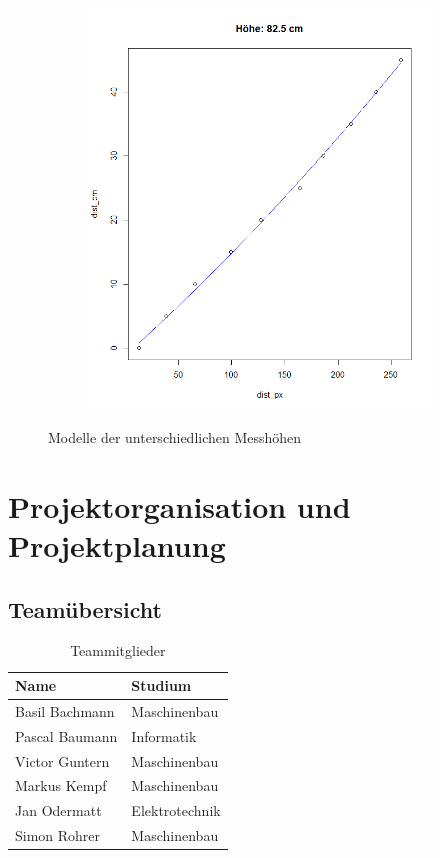 \documentclass[a4paper]{report}
\begin{document}
\begin{figure}[h]
\begin{subfigure}[b]{0.3\textwidth}
	\end{subfigure}
	\hfill
	\begin{subfigure}[b]{0.3\textwidth}
		\includegraphics[width=\textwidth]{hoehe82_5}
	\end{subfigure}
	\caption{Modelle der unterschiedlichen Messhöhen}
	\label{fig:Modelle}
\end{figure}


\chapter{Projektorganisation und Projektplanung}
\label{ch:ProjektOrga}

\section{Teamübersicht}
\label{sec:Teamuebersicht}
\begin{table}[h!]
	\centering
	\begin{tabular}{|p{}|p{}|}
		\hline
		\textbf{Name} & \textbf{Studium} \\
		\hline
		Basil Bachmann & Maschinenbau \\
		\hline
		Pascal Baumann & Informatik \\
		\hline
		Victor Guntern & Maschinenbau \\
		\hline
		Markus Kempf & Maschinenbau \\
		\hline
		Jan Odermatt & Elektrotechnik \\
		\hline
		Simon Rohrer & Maschinenbau \\
		\hline
	\end{tabular}
	\caption{Teammitglieder}
	\label{tab:TeamMitglieder}
\end{table}
\end{document}
